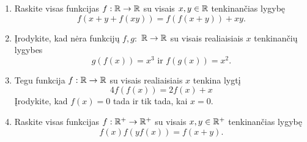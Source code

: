 \begin{enumerate}
  \item Raskite visas funkcijas $f:\mathbb R\to\mathbb R$ su visais $x, y \in \mathbb R$
    tenkinančias lygybę $$f(x+y +f(xy)) = f(f(x+y)) + xy.$$
  \item Įrodykite, kad nėra funkcijų $f,g:$ $\mathbb R \to \mathbb R$ su visais
    realiaisiais $x$ tenkinančių lygybes $$g(f(x)) = x^3 \text{ ir }
    f(g(x))=x^2.$$
  \item Tegu funkcija $f: \mathbb R \to \mathbb R$ su visais realiaisiais $x$ tenkina
    lygtį $$4f(f(x))= 2f(x)+x$$ Įrodykite, kad $f(x)=0$ tada ir tik tada,
    kai $x=0$.
  \item Raskite visas funkcijas $f:\mathbb R^+\to\mathbb R^+$ su visais $x, y \in \mathbb R^+$
    tenkinančias lygybę $$f(x)f(yf(x))=f(x+y).$$

\end{enumerate}
